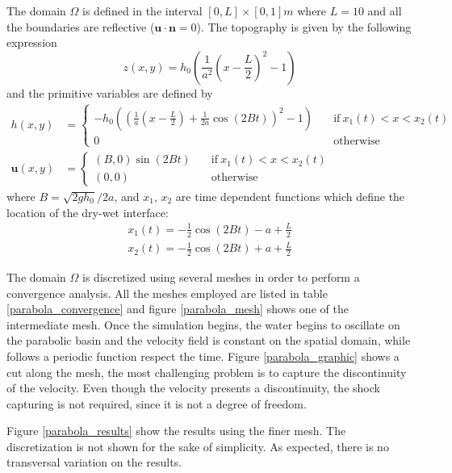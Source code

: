\documentclass[a4paper,12pt]{article}
\begin{document}
The domain $\Omega$ is defined in the interval $[0,L]\times[0,1]m$ where $L=10$ and all the boundaries are reflective ($\mathbf{u}\cdot\mathbf{n} = 0$). The topography is given by the following expression
\begin{equation}
z(x,y) = h_0 \left(\frac{1}{a^2}\left(x - \frac{L}{2}\right)^2 - 1\right)
\end{equation}
and the primitive variables are defined by
\begin{subequations}
\begin{align}
h(x,y) &=
\begin{cases}
-h_0\left(\left(\frac{1}{a}\left(x - \frac{L}{2}\right) + \frac{1}{2a}\cos(2Bt)\right)^2 - 1\right)
\quad &\text{if} \ x_1(t) < x < x_2(t) \\
0 \quad &\text{otherwise}
\end{cases} \\
\mathbf{u}(x,y) &=
\begin{cases}
(B,0)\sin(2Bt) \quad &\text{if} \ x_1(t) < x < x_2(t) \\
(0,0) \quad &\text{otherwise}
\end{cases}
\end{align}
\end{subequations}
where $B=\sqrt{2gh_0}/2a$, and $x_1$, $x_2$ are time dependent functions which define the location of the dry-wet interface:
\begin{equation}
\begin{split}
x_1(t) = -\frac{1}{2}\cos(2Bt) - a + \frac{L}{2} \\
x_2(t) = -\frac{1}{2}\cos(2Bt) + a + \frac{L}{2}
\end{split}
\end{equation}

The domain $\Omega$ is discretized using several meshes in order to perform a convergence analysis. All the meshes employed are listed in table \ref{parabola_convergence} and figure \ref{parabola_mesh} shows one of the intermediate mesh. Once the simulation begins, the water begins to oscillate on the parabolic basin and the velocity field is constant on the spatial domain, while follows a periodic function respect the time. Figure \ref{parabola_graphic} shows a cut along the mesh, the most challenging problem is to capture the discontinuity of the velocity. Even though the velocity presents a discontinuity, the shock capturing is not required, since it is not a degree of freedom.

Figure \ref{parabola_results} show the results using the finer mesh. The discretization is not shown for the sake of simplicity. As expected, there is no transversal variation on the results.
\end{document}
